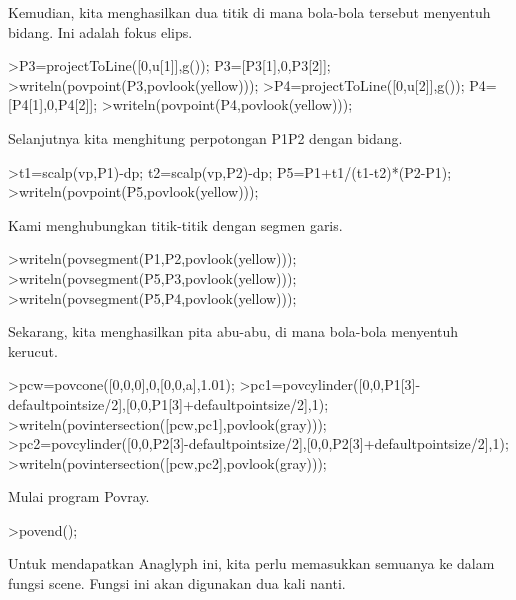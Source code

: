 \documentclass[12pt,arial,letterpaper]{book}
\begin{document}
\begin{eulernootebook}
\begin{eulercomment}
\begin{eulercomment}
\begin{eulernootebook}
\begin{eulercomment}
\begin{eulercomment}
\begin{eulercomment}
\begin{eulercomment}
\begin{eulercomment}
\begin{eulercomment}
\begin{eulernotebook}
\begin{eulercomment}
\begin{eulercomment}
\begin{eulercomment}
\begin{eulercomment}
\begin{eulercomment}
\begin{eulercomment}
\begin{eulercomment}
Kemudian, kita menghasilkan dua titik di mana bola-bola tersebut
menyentuh bidang. Ini adalah fokus elips.
\end{eulercomment}
\begin{eulerprompt}
>P3=projectToLine([0,u[1]],g()); P3=[P3[1],0,P3[2]];
>writeln(povpoint(P3,povlook(yellow)));
>P4=projectToLine([0,u[2]],g()); P4=[P4[1],0,P4[2]];
>writeln(povpoint(P4,povlook(yellow)));
\end{eulerprompt}
\begin{eulercomment}
Selanjutnya kita menghitung perpotongan P1P2 dengan bidang.
\end{eulercomment}
\begin{eulerprompt}
>t1=scalp(vp,P1)-dp; t2=scalp(vp,P2)-dp; P5=P1+t1/(t1-t2)*(P2-P1);
>writeln(povpoint(P5,povlook(yellow)));
\end{eulerprompt}
\begin{eulercomment}
Kami menghubungkan titik-titik dengan segmen garis.
\end{eulercomment}
\begin{eulerprompt}
>writeln(povsegment(P1,P2,povlook(yellow)));
>writeln(povsegment(P5,P3,povlook(yellow)));
>writeln(povsegment(P5,P4,povlook(yellow)));
\end{eulerprompt}
\begin{eulercomment}
Sekarang, kita menghasilkan pita abu-abu, di mana bola-bola menyentuh
kerucut.
\end{eulercomment}
\begin{eulerprompt}
>pcw=povcone([0,0,0],0,[0,0,a],1.01);
>pc1=povcylinder([0,0,P1[3]-defaultpointsize/2],[0,0,P1[3]+defaultpointsize/2],1);
>writeln(povintersection([pcw,pc1],povlook(gray)));
>pc2=povcylinder([0,0,P2[3]-defaultpointsize/2],[0,0,P2[3]+defaultpointsize/2],1);
>writeln(povintersection([pcw,pc2],povlook(gray)));
\end{eulerprompt}
\begin{eulercomment}
Mulai program Povray.
\end{eulercomment}
\begin{eulerprompt}
>povend();
\end{eulerprompt}
\begin{eulercomment}
Untuk mendapatkan Anaglyph ini, kita perlu memasukkan semuanya ke
dalam fungsi scene. Fungsi ini akan digunakan dua kali nanti.
\end{eulercomment}
\begin{eulerprompt}

\end{eulerprompt}
\end{eulercomment}
\end{eulercomment}
\end{eulercomment}
\end{eulercomment}
\end{eulercomment}
\end{eulercomment}
\end{eulernotebook}
\end{eulercomment}
\end{eulercomment}
\end{eulercomment}
\end{eulercomment}
\end{eulercomment}
\end{eulercomment}
\end{eulernootebook}
\end{eulercomment}
\end{eulercomment}
\end{eulernootebook}
\end{document}
